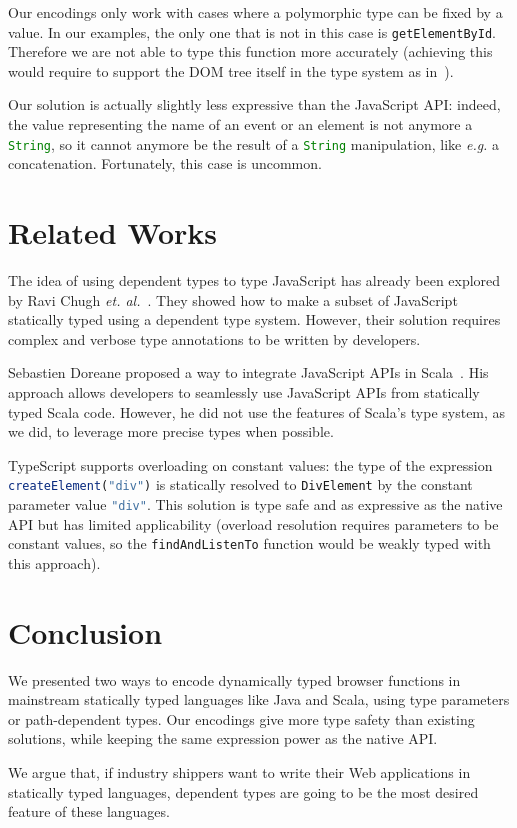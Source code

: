 \documentclass{llncs}
\newcommand{\jscode}[1]{\lstinline[language=JavaScript]|#1|}
\begin{document}
Our encodings only work with cases where a polymorphic type can be fixed by a value. In our examples, the only one that is not in this case is \jscode{getElementById}. Therefore we are not able to type this function more accurately (achieving this would require to support the DOM tree itself in the type system as in~\cite{Lerner13_TypedJQuery}).

Our solution is actually slightly less expressive than the JavaScript API: indeed, the value representing the name of an event or an element is not anymore a \jscode{String}, so it cannot anymore be the result of a \jscode{String} manipulation, like \emph{e.g.} a concatenation. Fortunately, this case is uncommon.

\section{Related Works}
\label{sec-related}

The idea of using dependent types to type JavaScript has already been explored by Ravi Chugh \emph{et. al.}~\cite{Chugh12_DJS}. They showed how to make a subset of JavaScript statically typed using a dependent type system. However, their solution requires complex and verbose type annotations to be written by developers.

Sebastien Doreane proposed a way to integrate JavaScript APIs in Scala~\cite{Doeraene13_ScalaJs}. His approach allows developers to seamlessly use JavaScript APIs from statically typed Scala code. However, he did not use the features of Scala's type system, as we did, to leverage more precise types when possible.

TypeScript supports overloading on constant values: the type of the expression \jscode{createElement("div")} is statically resolved to \jscode{DivElement} by the constant parameter value \jscode{"div"}. This solution is type safe and as expressive as the native API but has limited applicability (overload resolution requires parameters to be constant values, so the \jscode{findAndListenTo} function would be weakly typed with this approach).

\section{Conclusion}
\label{sec-conclusion}

We presented two ways to encode dynamically typed browser functions in mainstream statically typed languages like Java and Scala, using type parameters or path-dependent types. Our encodings give more type safety than existing solutions, while keeping the same expression power as the native API.

We argue that, if industry shippers want to write their Web applications in statically typed languages, dependent types are going to be the most desired feature of these languages.



\end{document}
